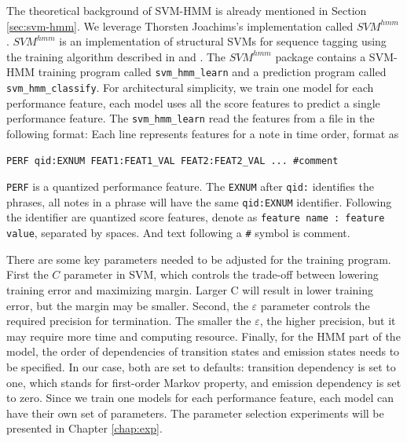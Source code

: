 The theoretical background of SVM-HMM is already mentioned in Section \ref{sec:svm-hmm}. We leverage Thorsten Joachims's implementation called $SVM^{hmm}$ \cite{Joachims2008}. $SVM^{hmm}$ is an implementation of structural SVMs for sequence tagging \cite{svm2003} using the training algorithm described in \cite{svm2005} and \cite{svm2009}. The $SVM^{hmm}$ package contains a SVM-HMM training program called \texttt{svm\_hmm\_learn} and a prediction program called \texttt{svm\_hmm\_classify}. For architectural simplicity, we train one model for each performance feature, each model uses all the score features to predict a single performance feature. The \texttt{svm\_hmm\_learn} read the features from a file  in the following format:
Each line represents features for a note in time order, format as
\begin{lstlisting}[style=nonumbers]
	PERF qid:EXNUM FEAT1:FEAT1_VAL FEAT2:FEAT2_VAL ... #comment
\end{lstlisting}
\texttt{PERF} is a quantized performance feature. The \texttt{EXNUM} after \texttt{qid:} identifies the phrases, all notes in a phrase will have the same \texttt{qid:EXNUM} identifier. Following the identifier are quantized score features, denote as \texttt{feature name : feature value}, separated by spaces. And text following a \texttt{\#} symbol is comment. %



There are some key parameters needed to be adjusted for the training program. First the $C$ parameter in SVM, which controls the trade-off between lowering training error and maximizing margin. Larger C will result in lower training error, but the margin may be smaller. Second, the $\varepsilon$ parameter controls the required precision for termination. The smaller the $\varepsilon$, the higher precision, but it may require more time and computing resource. Finally, for the HMM part of the model, the order of dependencies of transition states and emission states needs to be specified. In our case, both are set to defaults: transition dependency is set to one, which stands for first-order Markov property, and emission dependency is set to zero. Since we train one models for each performance feature, each model can have their own set of parameters. The parameter selection experiments will be presented in Chapter \ref{chap:exp}.

